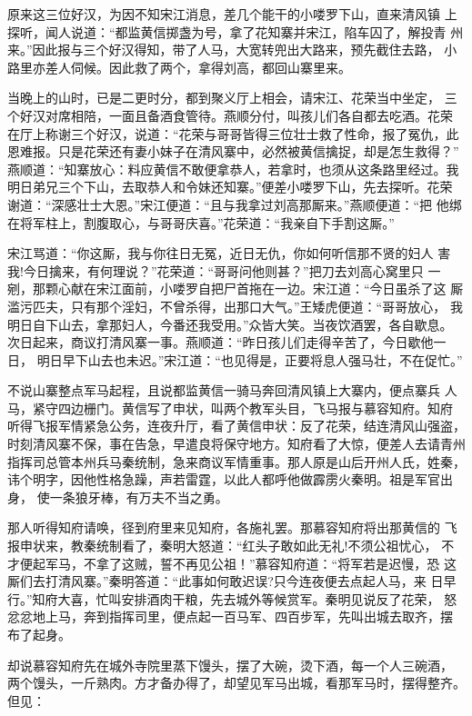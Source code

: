 原来这三位好汉，为因不知宋江消息，差几个能干的小喽罗下山，直来清风镇
上探听，闻人说道：“都监黄信掷盏为号，拿了花知寨并宋江，陷车囚了，解投青
州来。”因此报与三个好汉得知，带了人马，大宽转兜出大路来，预先截住去路，
小路里亦差人伺候。因此救了两个，拿得刘高，都回山寨里来。

当晚上的山时，已是二更时分，都到聚义厅上相会，请宋江、花荣当中坐定，
三个好汉对席相陪，一面且备酒食管待。燕顺分付，叫孩儿们各自都去吃酒。花荣
在厅上称谢三个好汉，说道：“花荣与哥哥皆得三位壮士救了性命，报了冤仇，此
恩难报。只是花荣还有妻小妹子在清风寨中，必然被黄信擒捉，却是怎生救得？”
燕顺道：“知寨放心：料应黄信不敢便拿恭人，若拿时，也须从这条路里经过。我
明日弟兄三个下山，去取恭人和令妹还知寨。”便差小喽罗下山，先去探听。花荣
谢道：“深感壮士大恩。”宋江便道：“且与我拿过刘高那厮来。”燕顺便道：“把
他绑在将军柱上，割腹取心，与哥哥庆喜。”花荣道：“我亲自下手割这厮。”

宋江骂道：“你这厮，我与你往日无冤，近日无仇，你如何听信那不贤的妇人
害我!今日擒来，有何理说？”花荣道：“哥哥问他则甚？”把刀去刘高心窝里只
一剜，那颗心献在宋江面前，小喽罗自把尸首拖在一边。宋江道：“今日虽杀了这
厮滥污匹夫，只有那个淫妇，不曾杀得，出那口大气。”王矮虎便道：“哥哥放心，
我明日自下山去，拿那妇人，今番还我受用。”众皆大笑。当夜饮酒罢，各自歇息。
次日起来，商议打清风寨一事。燕顺道：“昨日孩儿们走得辛苦了，今日歇他一日，
明日早下山去也未迟。”宋江道：“也见得是，正要将息人强马壮，不在促忙。”

不说山寨整点军马起程，且说都监黄信一骑马奔回清风镇上大寨内，便点寨兵
人马，紧守四边栅门。黄信写了申状，叫两个教军头目，飞马报与慕容知府。知府
听得飞报军情紧急公务，连夜升厅，看了黄信申状：反了花荣，结连清风山强盗，
时刻清风寨不保，事在告急，早遣良将保守地方。知府看了大惊，便差人去请青州
指挥司总管本州兵马秦统制，急来商议军情重事。那人原是山后开州人氏，姓秦，
讳个明字，因他性格急躁，声若雷霆，以此人都呼他做霹雳火秦明。祖是军官出身，
使一条狼牙棒，有万夫不当之勇。

那人听得知府请唤，径到府里来见知府，各施礼罢。那慕容知府将出那黄信的
飞报申状来，教秦统制看了，秦明大怒道：“红头子敢如此无礼!不须公祖忧心，
不才便起军马，不拿了这贼，誓不再见公祖！”慕容知府道：“将军若是迟慢，恐
这厮们去打清风寨。”秦明答道：“此事如何敢迟误?只今连夜便去点起人马，来
日早行。”知府大喜，忙叫安排酒肉干粮，先去城外等候赏军。秦明见说反了花荣，
怒忿忿地上马，奔到指挥司里，便点起一百马军、四百步军，先叫出城去取齐，摆
布了起身。

却说慕容知府先在城外寺院里蒸下馒头，摆了大碗，烫下酒，每一个人三碗酒，
两个馒头，一斤熟肉。方才备办得了，却望见军马出城，看那军马时，摆得整齐。
但见：

